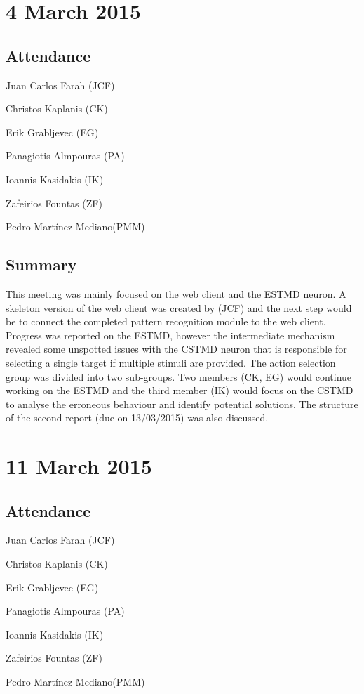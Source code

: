 \documentclass[a4paper,11pt]{article}
\begin{document}
\section*{4 March 2015}
\subsection*{Attendance}
\begin{compactenum}
\item Juan Carlos Farah (JCF)
\item Christos Kaplanis (CK)
\item Erik Grabljevec (EG)
\item Panagiotis Almpouras (PA)
\item Ioannis Kasidakis (IK)
\item Zafeirios Fountas (ZF)
\item Pedro Martínez Mediano(PMM)
\end{compactenum}

\subsection*{Summary}
This meeting was mainly focused on the web client and the ESTMD neuron. A skeleton version of the web client was created by (JCF) and the next step would be to connect the completed pattern recognition module to the web client. Progress was reported on the ESTMD, however the intermediate mechanism revealed some unspotted issues with the CSTMD neuron that is responsible for selecting a single target if multiple stimuli are provided. The action selection group was divided into two sub-groups. Two members (CK, EG) would continue working on the ESTMD and the third member (IK) would focus on the CSTMD to analyse the erroneous behaviour and identify potential solutions. The structure of the second report (due on 13/03/2015) was also discussed.

\maketitle
\section*{11 March 2015}
\subsection*{Attendance}
\begin{compactenum}
\item Juan Carlos Farah (JCF)
\item Christos Kaplanis (CK)
\item Erik Grabljevec (EG)
\item Panagiotis Almpouras (PA)
\item Ioannis Kasidakis (IK)
\item Zafeirios Fountas (ZF)
\item Pedro Martínez Mediano(PMM)
\end{compactenum}
\end{document}
